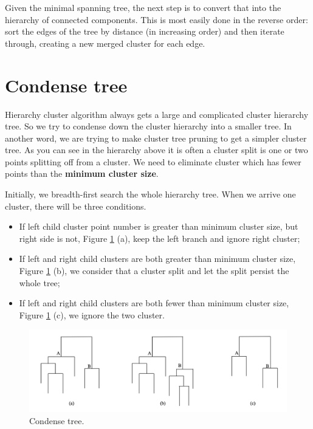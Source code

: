 \documentclass{article}
\begin{document}
Given the minimal spanning tree, the next step is to convert that into the hierarchy of connected components. This is most easily done in the reverse order: sort the edges of the tree by distance (in increasing order) and then iterate through, creating a new merged cluster for each edge. 

\section{Condense tree}

Hierarchy cluster algorithm always gets a large and complicated cluster hierarchy tree. So we try to condense down the cluster hierarchy into a smaller tree. In another word, we are trying to make cluster tree pruning to get a simpler cluster tree. As you can see in the hierarchy above it is often a cluster split is one or two points splitting off from a cluster. We need to eliminate cluster which has fewer points than the \textbf{minimum cluster size}. 

Initially, we breadth-first search the whole hierarchy tree. When we arrive one cluster, there will be three conditions.

\begin{itemize}
	\item If left child cluster point number is greater than minimum cluster size, but right side is not, Figure \ref{fig:condtree} (a), keep the left branch and ignore right cluster;
	\item If left and right child clusters are both greater than minimum cluster size, Figure \ref{fig:condtree} (b), we consider that a cluster split and let the split persist the whole tree;
	\item If left and right child clusters are both fewer than minimum cluster size, Figure \ref{fig:condtree} (c), we ignore the two cluster.
\end{itemize}

\begin{figure}[h!]
	\centering
	\includegraphics[scale=0.45]{b.png}
	\caption{Condense tree.}
	\label{fig:condtree}
\end{figure}
\end{document}
